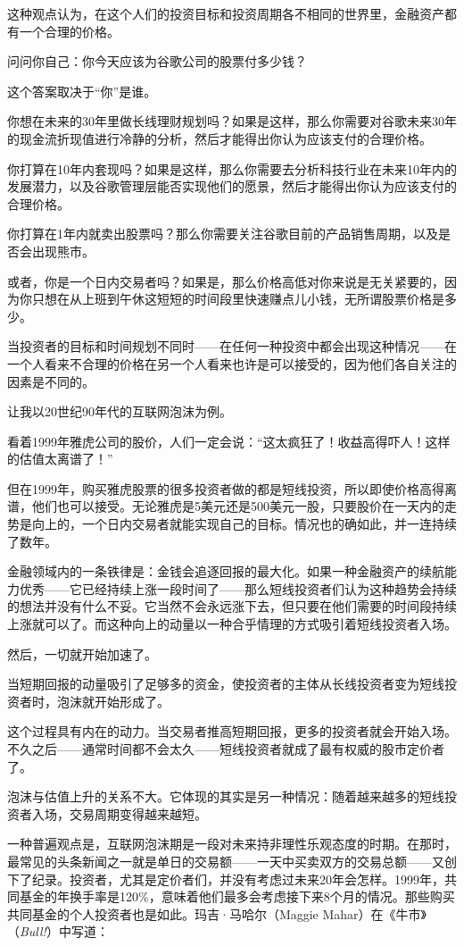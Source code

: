 这种观点认为，在这个人们的投资目标和投资周期各不相同的世界里，金融资产都有一个合理的价格。

问问你自己：你今天应该为谷歌公司的股票付多少钱？

这个答案取决于“你”是谁。

你想在未来的30年里做长线理财规划吗？如果是这样，那么你需要对谷歌未来30年的现金流折现值进行冷静的分析，然后才能得出你认为应该支付的合理价格。

你打算在10年内套现吗？如果是这样，那么你需要去分析科技行业在未来10年内的发展潜力，以及谷歌管理层能否实现他们的愿景，然后才能得出你认为应该支付的合理价格。

你打算在1年内就卖出股票吗？那么你需要关注谷歌目前的产品销售周期，以及是否会出现熊市。

或者，你是一个日内交易者吗？如果是，那么价格高低对你来说是无关紧要的，因为你只想在从上班到午休这短短的时间段里快速赚点儿小钱，无所谓股票价格是多少。

当投资者的目标和时间规划不同时——在任何一种投资中都会出现这种情况——在一个人看来不合理的价格在另一个人看来也许是可以接受的，因为他们各自关注的因素是不同的。

让我以20世纪90年代的互联网泡沫为例。

看着1999年雅虎公司的股价，人们一定会说：“这太疯狂了！收益高得吓人！这样的估值太离谱了！”

但在1999年，购买雅虎股票的很多投资者做的都是短线投资，所以即使价格高得离谱，他们也可以接受。无论雅虎是5美元还是500美元一股，只要股价在一天内的走势是向上的，一个日内交易者就能实现自己的目标。情况也的确如此，并一连持续了数年。

金融领域内的一条铁律是：金钱会追逐回报的最大化。如果一种金融资产的续航能力优秀——它已经持续上涨一段时间了——那么短线投资者们认为这种趋势会持续的想法并没有什么不妥。它当然不会永远涨下去，但只要在他们需要的时间段持续上涨就可以了。而这种向上的动量以一种合乎情理的方式吸引着短线投资者入场。

然后，一切就开始加速了。

当短期回报的动量吸引了足够多的资金，使投资者的主体从长线投资者变为短线投资者时，泡沫就开始形成了。

这个过程具有内在的动力。当交易者推高短期回报，更多的投资者就会开始入场。不久之后——通常时间都不会太久——短线投资者就成了最有权威的股市定价者了。

泡沫与估值上升的关系不大。它体现的其实是另一种情况：随着越来越多的短线投资者入场，交易周期变得越来越短。

一种普遍观点是，互联网泡沫期是一段对未来持非理性乐观态度的时期。在那时，最常见的头条新闻之一就是单日的交易额——一天中买卖双方的交易总额——又创下了纪录。投资者，尤其是定价者们，并没有考虑过未来20年会怎样。1999年，共同基金的年换手率是120\%，意味着他们最多会考虑接下来8个月的情况。那些购买共同基金的个人投资者也是如此。玛吉·马哈尔（Maggie Mahar）在《牛市》（\textit{Bull!}）中写道：

